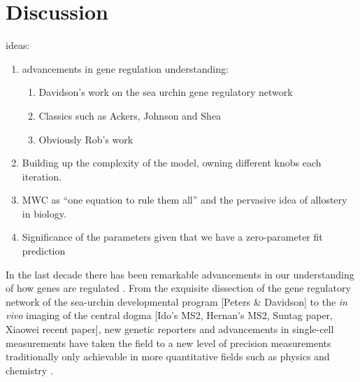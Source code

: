 \pagebreak
\section*{Discussion }



ideas:
\begin{enumerate}
  \item advancements in gene regulation understanding:
    \begin{enumerate}
      \item Davidson's work on the sea urchin gene regulatory network
      \item Classics such as Ackers, Johnson and Shea
      \item Obviously Rob's work
    \end{enumerate}
  \item Building up the complexity of the model, owning different knobs each
  iteration.
  \item MWC as ``one equation to rule them all'' and the pervasive idea of
  allostery in biology.
  \item Significance of the parameters given that we have a zero-parameter fit
  prediction
\end{enumerate}

In the last decade there has been remarkable advancements in our understanding
of how genes are regulated . From the exquisite dissection of the gene regulatory
network of the sea-urchin developmental program [Peters & Davidson] to the
\textit{in vivo} imaging of the central dogma [Ido's MS2, Hernan's MS2, Suntag
paper, Xiaowei recent paper], new genetic reporters and  advancements in
single-cell measurements have taken the field to a new level of precision
measurements traditionally only achievable in more quantitative fields such as
physics and chemistry .

